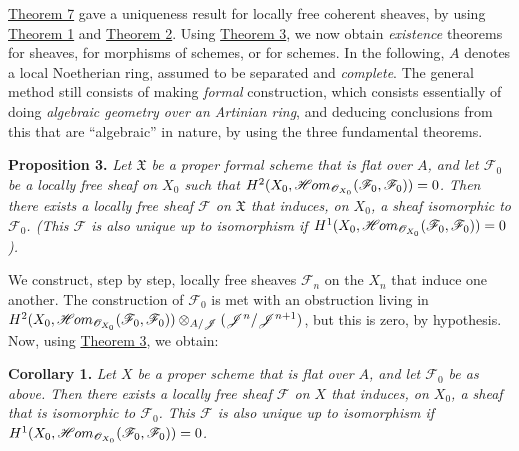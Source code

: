 \documentclass{article}
\newenvironment{itenv}[1]
  {\phantomsection\par\smallskip\noindent\textbf{#1.}\itshape}
  {\par\smallskip}
\theoremstyle{definition}
\theoremstyle{definition}
\theoremstyle{definition}
\theoremstyle{definition}
\theoremstyle{remark}
\begin{document}
\protect\hyperlink{fga-2-theorem-7}{Theorem 7} gave a uniqueness result for locally free coherent sheaves, by using \protect\hyperlink{fga-2-theorem-1}{Theorem 1} and \protect\hyperlink{fga-2-theorem-2}{Theorem 2}.
Using \protect\hyperlink{fga-2-theorem-3}{Theorem 3}, we now obtain \emph{existence} theorems for sheaves, for morphisms of schemes, or for schemes.
In the following, \(A\) denotes a local Noetherian ring, assumed to be separated and \emph{complete}.
The general method still consists of making \emph{formal} construction, which consists essentially of doing \emph{algebraic geometry over an Artinian ring}, and deducing conclusions from this that are ``algebraic'' in nature, by using the three fundamental theorems.

\leavevmode{}%
\begin{itenv}{Proposition 3}
Let \({\mathfrak{X}}\) be a proper formal scheme that is flat over \(A\), and let \({\mathscr{F}}_0\) be a locally free sheaf on \(X_0\) such that \(H^2(X_0,\mathscr{H}\kern -.5pt om_{{\mathscr{O}}_{X_0}}({\mathscr{F}}_0,{\mathscr{F}}_0))=0\).
Then there exists a locally free sheaf \({\mathscr{F}}\) on \({\mathfrak{X}}\) that induces, on \(X_0\), a sheaf isomorphic to \({\mathscr{F}}_0\).
(This \({\mathscr{F}}\) is also unique up to isomorphism if \(H^1(X_0,\mathscr{H}\kern -.5pt om_{{\mathscr{O}}_{X_0}}({\mathscr{F}}_0,{\mathscr{F}}_0))=0\)).

\end{itenv}

We construct, step by step, locally free sheaves \({\mathscr{F}}_n\) on the \(X_n\) that induce one another.
The construction of \({\mathscr{F}}_0\) is met with an obstruction living in \(H^2(X_0,\mathscr{H}\kern -.5pt om_{{\mathscr{O}}_{X_0}}({\mathscr{F}}_0,{\mathscr{F}}_0))\otimes_{A/{\mathscr{J}}}({\mathscr{J}}^n/{\mathscr{J}}^{n+1})\), but this is zero, by hypothesis.
Now, using \protect\hyperlink{fga-2-theorem-3}{Theorem 3}, we obtain:

\leavevmode{}%
\begin{itenv}{Corollary 1}
Let \(X\) be a proper scheme that is flat over \(A\), and let \({\mathscr{F}}_0\) be as above.
Then there exists a locally free sheaf \({\mathscr{F}}\) on \(X\) that induces, on \(X_0\), a sheaf that is isomorphic to \({\mathscr{F}}_0\).
This \({\mathscr{F}}\) is also unique up to isomorphism if \(H^1(X_0,\mathscr{H}\kern -.5pt om_{{\mathscr{O}}_{X_0}}({\mathscr{F}}_0,{\mathscr{F}}_0))=0\).

\end{itenv}
\end{document}

